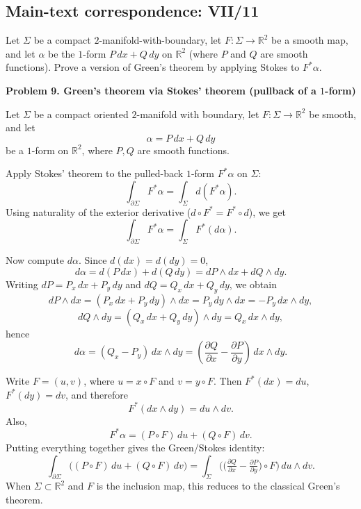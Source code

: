 \subsection*{Main-text correspondence: VII/11}

\begin{problem}
\label{prob:cp-vii-0037}
Let $\Sigma$ be a compact $2$-manifold-with-boundary, let $F : \Sigma \to \mathbb{R}^2$ be a smooth map,
	and let $\alpha$ be the $1$-form $P\,dx + Q\,dy$ on $\mathbb{R}^2$ (where $P$ and $Q$ are smooth functions).
	Prove a version of Green's theorem by applying Stokes to $F^{*}\alpha$.
	
	
	\bigskip
	\textbf{Problem 9. Green's theorem via Stokes' theorem (pullback of a $1$-form)}
\end{problem}

\begin{solution}
Let $\Sigma$ be a compact oriented $2$-manifold with boundary, let $F:\Sigma\to\mathbb{R}^2$ be smooth, and let
	\[
	\alpha = P\,dx + Q\,dy
	\]
	be a $1$-form on $\mathbb{R}^2$, where $P,Q$ are smooth functions.
	
	Apply Stokes' theorem to the pulled-back $1$-form $F^*\alpha$ on $\Sigma$:
	\[
	\int_{\partial\Sigma} F^*\alpha
	=
	\int_{\Sigma} d(F^*\alpha).
	\]
	Using naturality of the exterior derivative ($d\circ F^* = F^*\circ d$), we get
	\[
	\int_{\partial\Sigma} F^*\alpha
	=
	\int_{\Sigma} F^*(d\alpha).
	\]
	
	Now compute $d\alpha$. Since $d(dx)=d(dy)=0$,
	\[
	d\alpha = d(P\,dx)+d(Q\,dy)= dP\wedge dx + dQ\wedge dy.
	\]
	Writing $dP=P_x\,dx+P_y\,dy$ and $dQ=Q_x\,dx+Q_y\,dy$, we obtain
	\[
	dP\wedge dx = (P_x\,dx+P_y\,dy)\wedge dx = P_y\,dy\wedge dx = -P_y\,dx\wedge dy,
	\]
	\[
	dQ\wedge dy = (Q_x\,dx+Q_y\,dy)\wedge dy = Q_x\,dx\wedge dy,
	\]
	hence
	\[
	d\alpha = (Q_x - P_y)\,dx\wedge dy
	=
	\left(\frac{\partial Q}{\partial x}-\frac{\partial P}{\partial y}\right)\,dx\wedge dy.
	\]
	
	Write $F=(u,v)$, where $u=x\circ F$ and $v=y\circ F$. Then $F^*(dx)=du$, $F^*(dy)=dv$, and therefore
	\[
	F^*(dx\wedge dy)=du\wedge dv.
	\]
	Also,
	\[
	F^*\alpha = (P\circ F)\,du + (Q\circ F)\,dv.
	\]
	Putting everything together gives the Green/Stokes identity:
	\[
	\int_{\partial\Sigma}\Big( (P\circ F)\,du + (Q\circ F)\,dv\Big)
	=
	\int_{\Sigma}
	\Big(\big(\tfrac{\partial Q}{\partial x}-\tfrac{\partial P}{\partial y}\big)\circ F\Big)\,du\wedge dv.
	\]
	When $\Sigma\subset\mathbb{R}^2$ and $F$ is the inclusion map, this reduces to the classical Green's theorem.
\end{solution}

